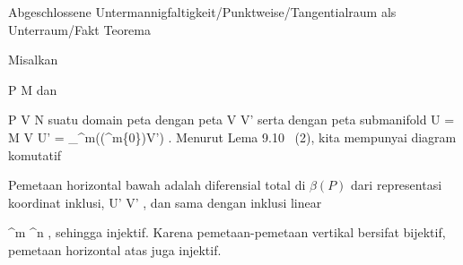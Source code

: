 {Abgeschlossene Untermannigfaltigkeit/Punktweise/Tangentialraum als Unterraum/Fakt}
{Teorema}
{}
{

\faktzusatz {}

}
{

Misalkan

\mavergleichskette
{\vergleichskette
{ P
}
{ \in }{ M
}
{  }{
}
{    }{
}
{   }{
}
}
{}{}{}
dan

\mavergleichskette
{\vergleichskette
{ P
}
{ \in }{ V
}
{ \subseteq }{ N
}
{    }{
}
{   }{
}
}
{}{}{}
suatu domain peta dengan peta
\maabbdisp {\alpha} { V } { V'
} {}
serta dengan peta submanifold
 {U = M \cap  V } { U' = _{\R^m}\bigl((\R^m\times\{0\})\cap V'\bigr)
} {.}
Menurut
Lema 9.10  (2),
kita mempunyai diagram komutatif

 {  }

Pemetaan horizontal bawah adalah diferensial total di $\beta(P)$ dari representasi koordinat inklusi,
 {U'} {V'
} {,}
dan sama dengan inklusi linear

\mavergleichskette
{\vergleichskette
{ \R^m
}
{ \subseteq }{\R^n
}
{  }{
}
{    }{
}
{   }{
}
}
{}{}{,}
sehingga injektif. Karena pemetaan-pemetaan vertikal bersifat bijektif, pemetaan horizontal atas juga injektif.

}


